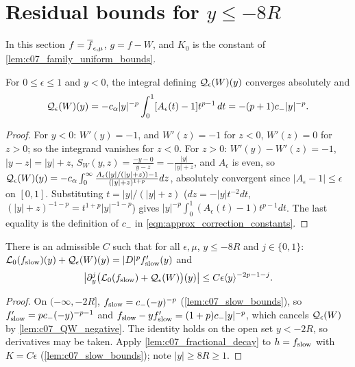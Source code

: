\section{Residual bounds for \texorpdfstring{$y\le-8R$}{y <= -8R}}

In this section $f=\overline{f}_{\epsilon,\mu}$, $g=f-W$, and $K_0$ is the constant of \cref{lem:c07_family_uniform_bounds}.

\begin{lemma}
  \label{lem:c07_QW_negative}
  For $0\le\epsilon\le1$ and $y<0$, the integral defining $\mathcal{Q}_\epsilon(W)(y)$ converges absolutely and
  \[
    \mathcal{Q}_\epsilon(W)(y)=-c_\alpha|y|^{-p}\int_0^1[A_\epsilon(t)-1]t^{p-1}\,dt=-(p+1)c_-|y|^{-p}.
  \]
\end{lemma}
\begin{proof}
  For $y<0$: $W'(y)=-1$, and $W'(z)=-1$ for $z<0$, $W'(z)=0$ for $z>0$; so the integrand vanishes for
  $z<0$. For $z>0$: $W'(y)-W'(z)=-1$, $|y-z|=|y|+z$, $S_W(y,z)=\frac{-y-0}{y-z}=-\frac{|y|}{|y|+z}$, and
  $A_\epsilon$ is even, so $\mathcal{Q}_\epsilon(W)(y)=-c_\alpha\int_0^\infty\frac{A_\epsilon(|y|/(|y|+z))-1}{(|y|+z)^{1+p}}dz$,
  absolutely convergent since $|A_\epsilon-1|\le\epsilon$ on $[0,1]$. Substituting $t=|y|/(|y|+z)$
  ($dz=-|y|t^{-2}dt$, $(|y|+z)^{-1-p}=t^{1+p}|y|^{-1-p}$) gives $|y|^{-p}\int_0^1(A_\epsilon(t)-1)t^{p-1}dt$.
  The last equality is the definition of $c_-$ in \eqref{eqn:approx_correction_constants}.
\end{proof}

\begin{lemma}
  \label{lem:c07_negative_slow}
  There is an admissible $C$ such that for all $\epsilon,\mu$, $y\le-8R$ and $j\in\{0,1\}$:
  $\mathcal{L}_0(f_{\textup{slow}})(y)+\mathcal{Q}_\epsilon(W)(y)=|D|^pf_{\textup{slow}}'(y)$ and
  \[\bigl|\partial_y^j\bigl(\mathcal{L}_0(f_{\textup{slow}})+\mathcal{Q}_\epsilon(W)\bigr)(y)\bigr|\le C\epsilon\langle y \rangle^{-2p-1-j}.\]
\end{lemma}
\begin{proof}
  On $(-\infty,-2R]$, $f_{\textup{slow}}=c_-(-y)^{-p}$ (\cref{lem:c07_slow_bounds}), so $f_{\textup{slow}}'=pc_-(-y)^{-p-1}$
  and $f_{\textup{slow}}-yf_{\textup{slow}}'=(1+p)c_-|y|^{-p}$, which cancels $\mathcal{Q}_\epsilon(W)$ by \cref{lem:c07_QW_negative}.
  The identity holds on the open set $y<-2R$, so derivatives may be taken. Apply
  \cref{lem:c07_fractional_decay} to $h=f_{\textup{slow}}$ with $K=C\epsilon$ (\cref{lem:c07_slow_bounds}); note $|y|\ge8R\ge1$.
\end{proof}

